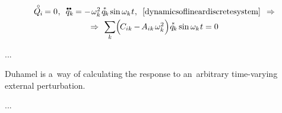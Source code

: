 \nopagebreak\vspace{-0.1em}\begin{equation}
\begin{array}{c}
\mathcircabove{Q}_{\hspace{-0.1ex}i} \hspace{-0.15ex} = 0
\hspace{.1ex} ,
\:\;
\mathdotdotabove{q}_k \hspace{-0.12ex} = - \hspace{.2ex} \omega_k^2 \hspace{.25ex} \mathasteriskabove{q}_{\hspace{-0.1ex}k} \hspace{-0.1ex} \operatorname{sin} \omega_k \hspace{.1ex} t
\hspace{.1ex} ,
\:\;
\eqref{dynamicsoflineardiscretesystem}
\:\: \Rightarrow
\\[.3em]
%
\Rightarrow \:\,
\scalebox{0.95}[1]{$\displaystyle \sum_{\smash{k}}$} \Bigl( \hspace{-0.2ex} C_{ik} \hspace{-0.1ex} - \hspace{-0.2ex} A_{ik} \hspace{.25ex} \omega_k^2 \hspace{.1ex} \Bigr) \hspace{.12ex}
\mathasteriskabove{q}_{\hspace{-0.1ex}k} \operatorname{sin} \omega_k \hspace{.1ex} t
= 0
\end{array}
\end{equation}

...


 Duhamel
is a~way of calculating the response
to an~arbitrary
time-varying
external
perturbation.

...

\section*{\small \wordforbibliography}

